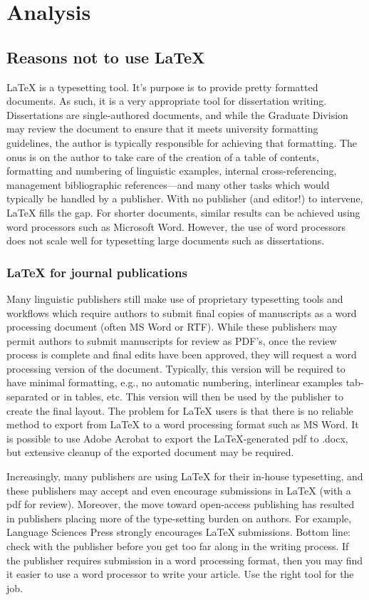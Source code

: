 \chapter{Analysis}\label{chap:analysis}
\section{Reasons not to use \LaTeX}
{\LaTeX} is a typesetting tool. It's purpose is to provide pretty formatted documents. As such, it is a very appropriate tool for dissertation writing. Dissertations are single-authored documents, and while the Graduate Division may review the document to ensure that it meets university formatting guidelines, the author is typically responsible for achieving that formatting. The onus is on the author to take care of the creation of a table of contents, formatting  and numbering of linguistic examples,  internal cross-referencing, management bibliographic references---and many other tasks which would typically be handled by a publisher. With no publisher (and editor!) to intervene, {\LaTeX} fills the gap. For shorter documents, similar results can be achieved using word processors such as Microsoft Word. However, the use of word processors does not scale well for typesetting large documents such as dissertations.

\subsection{{\LaTeX} for journal publications}
Many linguistic publishers still make use of proprietary typesetting tools and workflows which require authors to submit final copies of manuscripts as a word processing document (often MS Word or RTF). While these publishers may permit authors to submit manuscripts for review as PDF's, once the review process is complete and final edits have been approved, they will request a word processing version of the document. Typically, this version will be required to have minimal formatting, e.g., no automatic numbering, interlinear examples tab-separated or in tables, etc.  This version will then be used by the publisher to create the final layout. The problem for {\LaTeX} users is that there is no reliable method to export from {\LaTeX} to a word processing format such as MS Word. It is possible to use Adobe Acrobat to export the \LaTeX-generated pdf to .docx, but extensive cleanup of the exported document may be required. 

Increasingly, many publishers are using {\LaTeX} for their in-house typesetting, and these publishers may accept and even encourage submissions in {\LaTeX} (with a pdf for review). Moreover, the move toward open-access publishing has resulted in publishers placing more of the type-setting burden on authors. For example, Language Sciences Press strongly encourages {\LaTeX} submissions. Bottom line: check with the publisher before you get too far along in the writing process. If the publisher requires submission in a word processing format, then you may find it easier to use a word processor to write your article. Use the right tool for the job.

